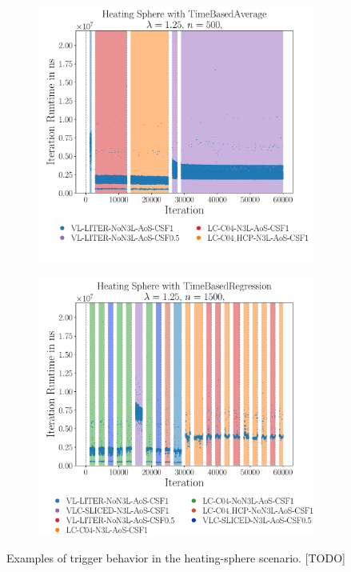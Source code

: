 \begin{figure}[htpb]
	\begin{subfigure}[c]{0.5\textwidth}
		\centering
		\includegraphics[width=\textwidth]{./Figures/plots/heating-sphere_configs_good.pdf}
	\end{subfigure}
	\begin{subfigure}[c]{0.5\textwidth}
		\centering
		\includegraphics[width=\textwidth]{./Figures/plots/heating-sphere_configs_bad.pdf}
	\end{subfigure}
	\caption{Examples of trigger behavior in the heating-sphere scenario. [TODO]}
	\label{fig:hs_trigger_behavior}
\end{figure}

